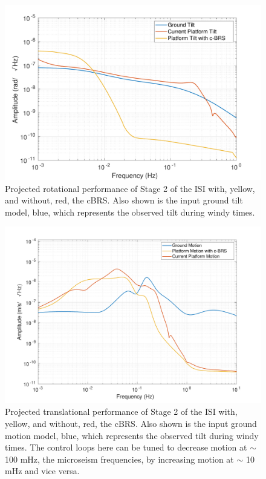 \documentclass [12pt, proquest]{uwthesis}[2019]
\begin{document}
\begin{figure}%
\begin{center}
\includegraphics[width=\textwidth]{cBRSRotation.pdf}
\caption{Projected rotational performance of Stage 2 of the ISI with, yellow, and without, red, the cBRS. Also shown is the input ground tilt model, blue, which represents the observed tilt during windy times.}
\label{cBRSR}
\end{center}
\end{figure}

\begin{figure}%
\begin{center}
\includegraphics[width=\textwidth]{cBRSTranslation.pdf}
\caption{Projected translational performance of Stage 2 of the ISI with, yellow, and without, red, the cBRS. Also shown is the input ground motion model, blue, which represents the observed tilt during windy times. The control loops here can be tuned to decrease motion at $\sim$ 100 mHz, the microseism frequencies, by increasing motion at $\sim$ 10 mHz and vice versa.}
\label{cBRST}
\end{center}
\end{figure}
\end{document}
